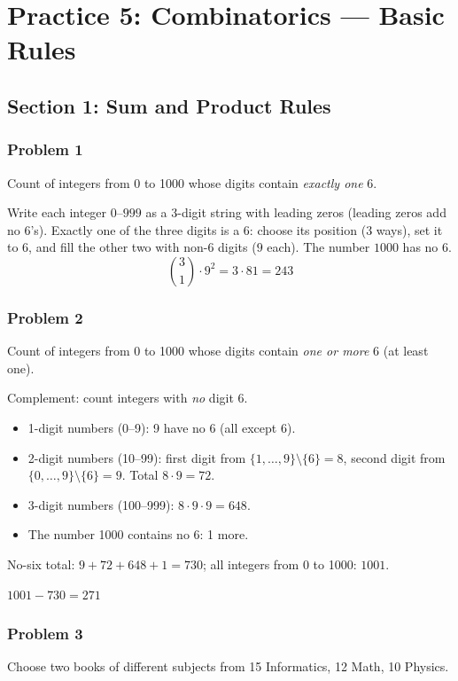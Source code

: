 
\section*{Practice 5: Combinatorics --- Basic Rules}

\subsection*{Section 1: Sum and Product Rules}

\subsubsection*{Problem 1}
Count of integers from 0 to 1000 whose digits contain \emph{exactly one} 6.

Write each integer $0$--$999$ as a 3-digit string with leading zeros (leading zeros add no 6's). Exactly one of the three digits is a 6: choose its position ($3$ ways), set it to 6, and fill the other two with non-6 digits ($9$ each). The number $1000$ has no 6.
\[ \binom{3}{1}\cdot 9^2 = 3\cdot 81 = \boxed{243} \]

\subsubsection*{Problem 2}
Count of integers from 0 to 1000 whose digits contain \emph{one or more} 6 (at least one).

Complement: count integers with \emph{no} digit 6.
\begin{itemize}
  \item 1-digit numbers (0--9): 9 have no 6 (all except 6).
  \item 2-digit numbers (10--99): first digit from $\{1,\dots,9\}\setminus\{6\}=8$, second digit from $\{0,\dots,9\}\setminus\{6\}=9$. Total $8\cdot9=72$.
  \item 3-digit numbers (100--999): $8\cdot9\cdot9=648$.
  \item The number 1000 contains no 6: 1 more.
\end{itemize}
No-six total: $9+72+648+1=730$; all integers from 0 to 1000: $1001$.

$\boxed{1001 - 730 = 271}$

\subsubsection*{Problem 3}
Choose two books of different subjects from 15 Informatics, 12 Math, 10 Physics.

